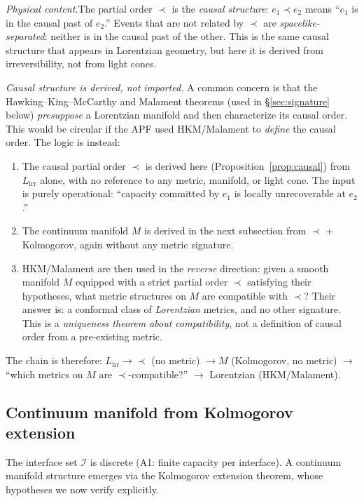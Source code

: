 \documentclass[11pt,a4paper]{article}
\theoremstyle{definition}
\begin{document}
\noindent\textit{Physical content.}\quad The partial order $\prec$ is
the \emph{causal structure}: $e_1 \prec e_2$ means ``$e_1$ is in the
causal past of $e_2$.''  Events that are not related by $\prec$ are
\emph{spacelike-separated}: neither is in the causal past of the other.
This is the same causal structure that appears in Lorentzian geometry,
but here it is derived from irreversibility, not from light cones.

\smallskip\noindent\textit{Causal structure is derived, not imported.}\quad
A common concern is that the Hawking--King--McCarthy and Malament theorems
(used in \S\ref{sec:signature} below) \emph{presuppose} a Lorentzian
manifold and then characterize its causal order.  This would be circular
if the APF used HKM/Malament to \emph{define} the causal order.  The
logic is instead:
\begin{enumerate}[label=(\alph*),nosep]
  \item The causal partial order $\prec$ is derived here
  (Proposition~\ref{prop:causal}) from $L_{\mathrm{irr}}$ alone, with no
  reference to any metric, manifold, or light cone.  The input is purely
  operational: ``capacity committed by $e_1$ is locally unrecoverable at
  $e_2$.''
  \item The continuum manifold $M$ is derived in the next subsection from
  $\prec$ + Kolmogorov, again without any metric signature.
  \item HKM/Malament are then used in the \emph{reverse} direction: given
  a smooth manifold $M$ equipped with a strict partial order $\prec$
  satisfying their hypotheses, what metric structures on $M$ are compatible
  with $\prec$?  Their answer is: a conformal class of \emph{Lorentzian}
  metrics, and no other signature.  This is a \emph{uniqueness theorem
  about compatibility}, not a definition of causal order from a
  pre-existing metric.
\end{enumerate}
The chain is therefore: $L_{\mathrm{irr}} \to \prec$ (no metric)
$\to M$ (Kolmogorov, no metric) $\to$ ``which metrics on $M$ are
$\prec$-compatible?'' $\to$ Lorentzian (HKM/Malament).


\subsection{Continuum manifold from Kolmogorov extension}
\label{sec:continuum}

The interface set $\mathcal{I}$ is discrete (A1: finite capacity per
interface).  A continuum manifold structure emerges via the Kolmogorov
extension theorem, whose hypotheses we now verify explicitly.
\end{document}
